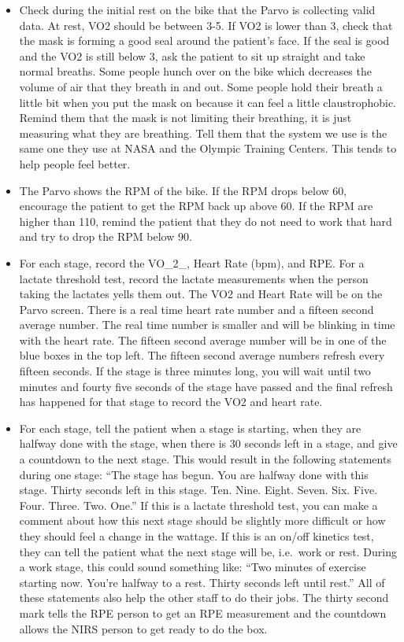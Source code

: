 \documentclass[
]{book}
\providecommand{\tightlist}{%
  \setlength{\itemsep}{0pt}\setlength{\parskip}{0pt}}
\begin{document}
\begin{itemize}
  \begin{itemize}
  \tightlist
  \item
    Check during the initial rest on the bike that the Parvo is collecting valid data. At rest, VO2 should be between 3-5. If VO2 is lower than 3, check that the mask is forming a good seal around the patient's face. If the seal is good and the VO2 is still below 3, ask the patient to sit up straight and take normal breaths. Some people hunch over on the bike which decreases the volume of air that they breath in and out. Some people hold their breath a little bit when you put the mask on because it can feel a little claustrophobic. Remind them that the mask is not limiting their breathing, it is just measuring what they are breathing. Tell them that the system we use is the same one they use at NASA and the Olympic Training Centers. This tends to help people feel better.
  \item
    The Parvo shows the RPM of the bike. If the RPM drops below 60, encourage the patient to get the RPM back up above 60. If the RPM are higher than 110, remind the patient that they do not need to work that hard and try to drop the RPM below 90.
  \item
    For each stage, record the VO\_2\_, Heart Rate (bpm), and RPE. For a lactate threshold test, record the lactate measurements when the person taking the lactates yells them out. The VO2 and Heart Rate will be on the Parvo screen. There is a real time heart rate number and a fifteen second average number. The real time number is smaller and will be blinking in time with the heart rate. The fifteen second average number will be in one of the blue boxes in the top left. The fifteen second average numbers refresh every fifteen seconds. If the stage is three minutes long, you will wait until two minutes and fourty five seconds of the stage have passed and the final refresh has happened for that stage to record the VO2 and heart rate.
  \item
    For each stage, tell the patient when a stage is starting, when they are halfway done with the stage, when there is 30 seconds left in a stage, and give a countdown to the next stage. This would result in the following statements during one stage: ``The stage has begun. You are halfway done with this stage. Thirty seconds left in this stage. Ten. Nine. Eight. Seven. Six. Five. Four. Three. Two. One.'' If this is a lactate threshold test, you can make a comment about how this next stage should be slightly more difficult or how they should feel a change in the wattage. If this is an on/off kinetics test, they can tell the patient what the next stage will be, i.e.~work or rest. During a work stage, this could sound something like: ``Two minutes of exercise starting now. You're halfway to a rest. Thirty seconds left until rest.'' All of these statements also help the other staff to do their jobs. The thirty second mark tells the RPE person to get an RPE measurement and the countdown allows the NIRS person to get ready to do the box.

\end{itemize}
\end{itemize}
\end{document}

